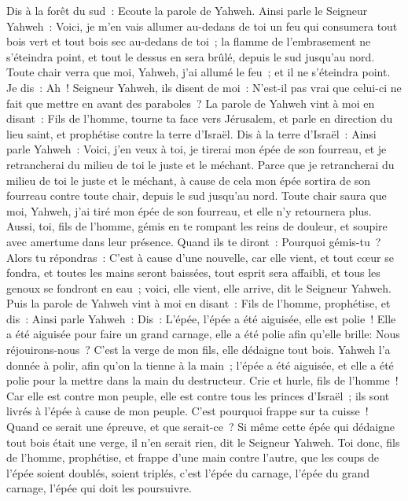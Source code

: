 \begin{multicols}{2}
Dis à la forêt du sud~: Ecoute la parole de Yahweh. Ainsi parle le Seigneur Yahweh~: Voici, je m'en vais allumer au-dedans de toi un feu qui consumera tout bois vert et tout bois sec au-dedans de toi~; la flamme de l'embrasement ne s'éteindra point, et tout le dessus en sera brûlé, depuis le sud jusqu'au nord.
Toute chair verra que moi, Yahweh, j'ai allumé le feu~; et il ne s'éteindra point.
Je dis~: Ah~! Seigneur Yahweh, ils disent de moi~: N'est-il pas vrai que celui-ci ne fait que mettre en avant des paraboles~?
La parole de Yahweh vint à moi en disant~:
Fils de l'homme, tourne ta face vers Jérusalem, et parle en direction du lieu saint, et prophétise contre la terre d'Israël.
Dis à la terre d'Israël~: Ainsi parle Yahweh~: Voici, j'en veux à toi, je tirerai mon épée de son fourreau, et je retrancherai du milieu de toi le juste et le méchant.
Parce que je retrancherai du milieu de toi le juste et le méchant, à cause de cela mon épée sortira de son fourreau contre toute chair, depuis le sud jusqu'au nord.
Toute chair saura que moi, Yahweh, j'ai tiré mon épée de son fourreau, et elle n'y retournera plus.
Aussi, toi, fils de l'homme, gémis en te rompant les reins de douleur, et soupire avec amertume dans leur présence.
Quand ils te diront~: Pourquoi gémis-tu~? Alors tu répondras~: C'est à cause d'une nouvelle, car elle vient, et tout cœur se fondra, et toutes les mains seront baissées, tout esprit sera affaibli, et tous les genoux se fondront en eau~; voici, elle vient, elle arrive, dit le Seigneur Yahweh.
Puis la parole de Yahweh vint à moi en disant~:
Fils de l'homme, prophétise, et dis~: Ainsi parle Yahweh~: Dis~: L'épée, l'épée a été aiguisée, elle est polie~!
Elle a été aiguisée pour faire un grand carnage, elle a été polie afin qu'elle brille: Nous réjouirons-nous~? C'est la verge de mon fils, elle dédaigne tout bois.
Yahweh l'a donnée à polir, afin qu'on la tienne à la main~; l'épée a été aiguisée, et elle a été polie pour la mettre dans la main du destructeur.
Crie et hurle, fils de l'homme~! Car elle est contre mon peuple, elle est contre tous les princes d'Israël~; ils sont livrés à l'épée à cause de mon peuple. C'est pourquoi frappe sur ta cuisse~!
Quand ce serait une épreuve, et que serait-ce~? Si même cette épée qui dédaigne tout bois était une verge, il n'en serait rien, dit le Seigneur Yahweh.
Toi donc, fils de l'homme, prophétise, et frappe d'une main contre l'autre, que les coups de l'épée soient doublés, soient triplés, c'est l'épée du carnage, l'épée du grand carnage, l'épée qui doit les poursuivre.

\end{multicols}
